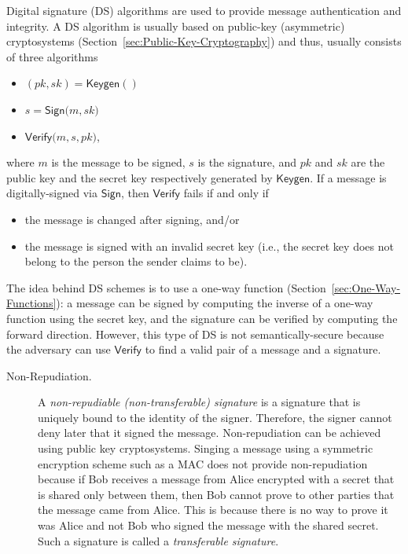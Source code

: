 \documentclass[10pt]{article}
\theoremstyle{plain}
\begin{document}
Digital signature (DS) algorithms are used to provide message authentication
and integrity. A DS algorithm is usually based on public-key (asymmetric)
cryptosystems (Section~\ref{sec:Public-Key-Cryptography}) and thus,
usually consists of three algorithms 
\begin{itemize}
	\item $(pk,sk)=\mathsf{Keygen}()$
	\item $s=\mathsf{Sign(}m,sk\mathsf{)}$
	\item $\mathsf{Verify(}m,s,pk\mathsf{)}$,
\end{itemize}
where $m$ is the message to be signed, $s$ is the signature, and
$pk$ and $sk$ are the public key and the secret key respectively
generated by $\mathsf{Keygen}$.\textsf{ }If a message is digitally-signed
via $\mathsf{Sign}$, then $\mathsf{Verify}$ fails if and only if
\begin{itemize}
	\item the message is changed after signing, and/or
	\item the message is signed with an invalid secret key (i.e., the secret
	key does not belong to the person the sender claims to be).
\end{itemize}
The idea behind DS schemes is to use a one-way function (Section~\ref{sec:One-Way-Functions}):
a message can be signed by computing the inverse of a one-way function
using the secret key, and the signature can be verified by computing
the forward direction. However, this type of DS is not semantically-secure
because the adversary can use $\mathsf{Verify}$ to find a valid pair
of a message and a signature.
\begin{description}
	\item [{Non-Repudiation.}] A \emph{non-repudiable (non-transferable) signature}
	is a signature that is uniquely bound to the identity of the signer.
	Therefore, the signer cannot deny later that it signed the message.
	Non-repudiation can be achieved using public key cryptosystems. Singing
	a message using a symmetric encryption scheme such as a MAC does not
	provide non-repudiation because if Bob receives a message from Alice
	encrypted with a secret that is shared only between them, then Bob
	cannot prove to other parties that the message came from Alice. This
	is because there is no way to prove it was Alice and not Bob who signed
	the message with the shared secret. Such a signature is called a \emph{transferable
		signature}.
\end{description}
\end{document}
